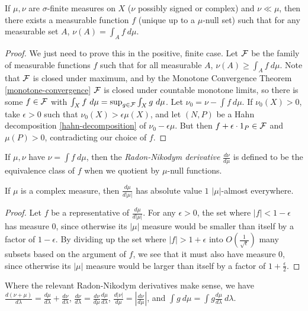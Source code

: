 \documentclass[letterpaper,11pt]{report}
\begin{document}
\begin{thm}\label{radon-nikodym} If $\mu, \nu$ are $\sigma$-finite measures on $X$ ($\nu$ possibly signed or complex) and $\nu \ll \mu$, then there exists a measurable function $f$ (unique up to a $\mu$-null set) such that for any measurable set $A$, $\nu(A) = \int_A f\ d\mu$.
\end{thm}
\begin{proof} We just need to prove this in the positive, finite case. Let $\mathcal{F}$ be the family of measurable functions $f$ such that for all measurable $A$, $\nu(A) \ge \int_A f\ d\mu$. Note that $\mathcal{F}$ is closed under maximum, and by the Monotone Convergence Theorem \ref{monotone-convergence} $\mathcal{F}$ is closed under countable monotone limits, so there is some $f \in \mathcal{F}$ with $\int_X f\ d\mu = \sup_{g \in \mathcal{F}} \int_X g\ d\mu$. Let $\nu_0 = \nu - \int f\ d\mu$. If $\nu_0(X) > 0$, take $\epsilon > 0$ such that $\nu_0(X) > \epsilon \mu(X)$, and let $(N,P)$ be a Hahn decomposition \ref{hahn-decomposition} of $\nu_0 - \epsilon \mu$. But then $f + \epsilon\cdot 1_P \in \mathcal{F}$ and $\mu(P) > 0$, contradicting our choice of $f$.
\end{proof}

\begin{defn} If $\mu, \nu$ have $\nu = \int f\ d\mu$, then the \emph{Radon-Nikodym derivative} $\frac{d\nu}{d\mu}$ is defined to be the equivalence class of $f$ when we quotient by $\mu$-null functions.
\end{defn}

\begin{prop} If $\mu$ is a complex measure, then $\frac{d\mu}{d|\mu|}$ has absolute value $1$ $|\mu|$-almost everywhere.
\end{prop}
\begin{proof} Let $f$ be a representative of $\frac{d\mu}{d|\mu|}$. For any $\epsilon > 0$, the set where $|f| < 1-\epsilon$ has measure $0$, since otherwise its $|\mu|$ measure would be smaller than itself by a factor of $1-\epsilon$. By dividing up the set where $|f| > 1+\epsilon$ into $O(\tfrac{1}{\sqrt{\epsilon}})$ many subsets based on the argument of $f$, we see that it must also have measure $0$, since otherwise its $|\mu|$ measure would be larger than itself by a factor of $1 + \frac{\epsilon}{2}$.
\end{proof}

\begin{prop} Where the relevant Radon-Nikodym derivatives make sense, we have $\frac{d(\nu+\mu)}{d\lambda} = \frac{d\mu}{d\lambda} + \frac{d\nu}{d\lambda}$, $\frac{d\nu}{d\lambda} = \frac{d\nu}{d\mu} \frac{d\mu}{d\lambda}$, $\frac{d|\nu|}{d\mu} = |\frac{d\nu}{d\mu}|$, and $\int g\ d\mu = \int g\frac{d\mu}{d\lambda}\ d\lambda$.
\end{prop}
\end{document}
